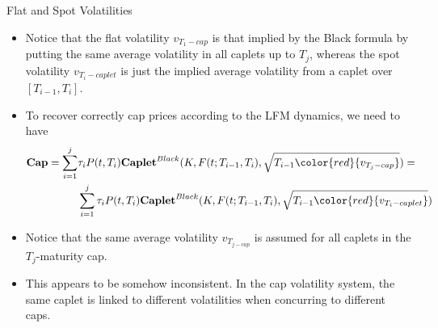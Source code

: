 \documentclass{beamer}
\begin{document}
\begin{frame}{Flat and Spot Volatilities}
	\begin{itemize}
		\item<1-> Notice that the flat volatility $v_{T_1-cap}$ is that implied by the Black formula by putting the same average volatility in all caplets up to $T_j$, whereas the spot volatility $v_{T_i-caplet}$ is just the implied average volatility from a caplet over $[T_{i-1}, T_i]$.
		\item<2-> To recover correctly cap prices according to the LFM dynamics, we need to have
		\begin{equation*}
			\begin{aligned}
				\textbf{Cap} = \sum_{i=1}^j&\tau_iP(t,T_i)\textbf{Caplet}^{Black}(K,F(t;T_{i-1},T_i),\sqrt{T_{i-1}\color{red}{v_{T_j-cap}}}) = \\ &\sum_{i=1}^j\tau_iP(t,T_i)\textbf{Caplet}^{Black}(K,F(t;T_{i-1},T_i),\sqrt{T_{i-1}\color{red}{v_{T_i-caplet}}})\\
			\end{aligned}
		\label{eq:spot_flat_vola}
		\end{equation*}
		\item<3-> Notice that the same average volatility $v_{T_{j-cap}}$ is assumed for all caplets in the $T_j$-maturity cap. 
		\item<4-> This appears to be somehow inconsistent. In the cap volatility system, the same caplet is linked to different volatilities when concurring to different caps.	
	\end{itemize}
\end{frame}	

\end{document}
